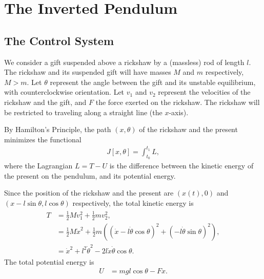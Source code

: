 %



\section*{The Inverted Pendulum}
\subsection*{The Control System}
We consider a gift suspended above a rickshaw by a (massless) rod of length $l$. 
The rickshaw and its suspended gift will have masses $M$ and $m$ respectively, $M > m$.  
Let $\theta $ represent the angle between the gift and its unstable equilibrium, with counterclockwise orientation. 
Let $v_1$ and $v_2$ represent the velocities of the rickshaw and the gift, and $F$ the force exerted on the rickshaw. 
The rickshaw will be restricted to traveling along a straight line (the $x$-axis). 

By Hamilton's Principle, the path $(x,\theta)$ of the rickshaw and the present minimizes the functional 
\begin{align}
J[x,\theta] = \int_{t_0}^{t_1}	L,
\end{align}
where the Lagrangian $L = T - U$ is the difference between the kinetic energy of the present on the pendulum, and its potential energy.

Since the position of the rickshaw and the present are $(x(t),0)$ and $(x-l\sin \theta, l\cos \theta)$ respectively, the total kinetic energy is 
\begin{align}
	\begin{split}
	T &= \frac{1}{2}Mv_1^2 +  \frac{1}{2}mv_2^2,\\
	&= \frac{1}{2}M\dot{x}^2 +  \frac{1}{2}m((\dot{x} - l\dot{\theta}\cos \theta)^2 + (- l\dot{\theta}\sin \theta)^2),\\
	&= \dot{x}^2 + l^2\dot{\theta}^2-2l\dot{x}\dot{\theta}\cos \theta.
	\end{split}
\end{align}
The total potential energy is 
\begin{align*}
U &= mgl\cos \theta - Fx.
\end{align*}

